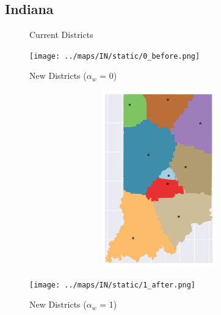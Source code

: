 \subsection{Indiana}
\begin{figure}[htb!] \centering
\caption{ Current Districts }
\texttt{[image: ../maps/IN/static/0\_before.png]}
\caption{ New Districts ($\alpha_w$ = 0) }
\includegraphics[width=5in,height=3in,keepaspectratio]{../maps/IN/static/0_after.png}
\caption{ New Districts ($\alpha_w$ = 1) }
\texttt{[image: ../maps/IN/static/1\_after.png]}
\end{figure}

\clearpage
\newpage

